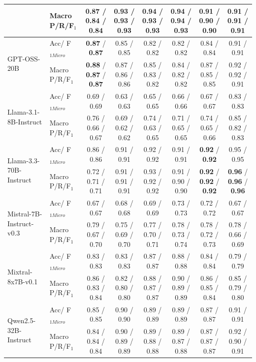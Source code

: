 \begin{table}[ht]
\begin{tabular}{l l c c c c c c}
& Macro P/R/F$_1$ & 0.87 / 0.84 / 0.84 & \textbf{0.93} / \textbf{0.93} / \textbf{0.93} & \textbf{0.94} / \textbf{0.93} / \textbf{0.93} & \textbf{0.94} / \textbf{0.94} / \textbf{0.93} & 0.91 / 0.90 / 0.90 & 0.91 / 0.91 / 0.91 \\
\hline
\multirow{2}{*}{GPT-OSS-20B} & Acc/ F$_{1Micro}$ & \textbf{0.87} / \textbf{0.87} & 0.85 / 0.85 & 0.82 / 0.82 & 0.82 / 0.82 & 0.84 / 0.84 & 0.91 / 0.91 \\
& Macro P/R/F$_1$ & \textbf{0.88} / \textbf{0.87} / \textbf{0.87} & 0.87 / 0.86 / 0.86 & 0.85 / 0.83 / 0.82 & 0.84 / 0.82 / 0.82 & 0.87 / 0.85 / 0.85 & 0.92 / 0.92 / 0.91 \\
\hline
\multirow{2}{*}{Llama-3.1-8B-Instruct} & Acc/ F$_{1Micro}$ & 0.69 / 0.69 & 0.63 / 0.63 & 0.65 / 0.65 & 0.66 / 0.66 & 0.67 / 0.67 & 0.83 / 0.83 \\
& Macro P/R/F$_1$ & 0.76 / 0.66 / 0.67 & 0.69 / 0.62 / 0.62 & 0.74 / 0.63 / 0.65 & 0.71 / 0.65 / 0.65 & 0.74 / 0.65 / 0.66 & 0.85 / 0.82 / 0.83 \\
\hline
\multirow{2}{*}{Llama-3.3-70B-Instruct} & Acc/ F$_{1Micro}$ & 0.86 / 0.86 & 0.91 / 0.91 & 0.92 / 0.92 & 0.91 / 0.91 & \textbf{0.92} / \textbf{0.92} & 0.95 / 0.95 \\
& Macro P/R/F$_1$ & 0.72 / 0.71 / 0.71 & 0.91 / 0.91 / 0.91 & 0.93 / 0.92 / 0.92 & 0.91 / 0.90 / 0.90 & \textbf{0.92} / \textbf{0.92} / \textbf{0.92} & \textbf{0.96} / \textbf{0.96} / \textbf{0.96} \\
\hline
\multirow{2}{*}{Mistral-7B-Instruct-v0.3} & Acc/ F$_{1Micro}$ & 0.67 / 0.67 & 0.68 / 0.68 & 0.69 / 0.69 & 0.73 / 0.73 & 0.72 / 0.72 & 0.67 / 0.67 \\
& Macro P/R/F$_1$ & 0.79 / 0.67 / 0.70 & 0.75 / 0.69 / 0.70 & 0.77 / 0.70 / 0.71 & 0.78 / 0.73 / 0.74 & 0.78 / 0.72 / 0.73 & 0.78 / 0.66 / 0.69 \\
\hline
\multirow{2}{*}{Mixtral-8x7B-v0.1} & Acc/ F$_{1Micro}$ & 0.83 / 0.83 & 0.83 / 0.83 & 0.87 / 0.87 & 0.88 / 0.88 & 0.84 / 0.84 & 0.79 / 0.79 \\
& Macro P/R/F$_1$ & 0.86 / 0.83 / 0.84 & 0.82 / 0.80 / 0.80 & 0.88 / 0.87 / 0.87 & 0.90 / 0.89 / 0.89 & 0.86 / 0.85 / 0.84 & 0.85 / 0.79 / 0.80 \\
\hline
\multirow{2}{*}{Qwen2.5-32B-Instruct} & Acc/ F$_{1Micro}$ & 0.85 / 0.85 & 0.90 / 0.90 & 0.89 / 0.89 & 0.89 / 0.89 & 0.87 / 0.87 & 0.91 / 0.91 \\
& Macro P/R/F$_1$ & 0.84 / 0.84 / 0.84 & 0.90 / 0.89 / 0.89 & 0.89 / 0.88 / 0.88 & 0.89 / 0.87 / 0.88 & 0.87 / 0.87 / 0.87 & 0.92 / 0.90 / 0.91 \\
\hline
\end{tabular}
\end{table}




